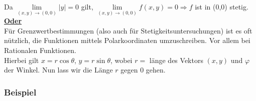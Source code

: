\noindent Da $\mathop {\lim }\limits_{(x,y) \to (0,0)} \left| y \right| = 0$ gilt, $\mathop {\lim }\limits_{(x,y) \to (0,0)} f(x,y) = 0 \Rightarrow f$ ist in (0,0) stetig.\\

\noindent \textbf{\underline{Oder}}\\

\noindent Für Grenzwertbestimmungen (also auch für Stetigkeitsuntersuchungen) ist es oft nützlich, die Funktionen mittels Polarkoordinaten umzuschreiben. Vor allem bei Rationalen Funktionen. \\

Hierbei gilt $x=r\cos\theta$, $y=r\sin\theta$, wobei $r=$ länge des Vektors $(x,y)$ und $\varphi$ der Winkel. Nun lass wir die Länge $r$ gegen 0 gehen. 

\subsubsection*{Beispiel}
